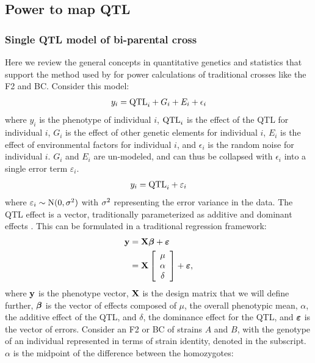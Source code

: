 \subsection{Power to map QTL}

\subsubsection{Single QTL model of bi-parental cross} 

Here we review the general concepts in quantitative genetics and statistics that support the method used by \cite{Sen2005} for power calculations of traditional crosses like the F2 and BC. Consider this model:
\begin{equation}
	y_{i} = \text{QTL}_{i} + G_{i} + E_{i} + \epsilon_{i}
    \label{eq:general_model}
\end{equation}
where $y_{i}$ is the phenotype of individual $i$, $\text{QTL}_{i}$ is the effect of the QTL for individual $i$, $G_{i}$ is the effect of other genetic elements for individual $i$, $E_{i}$ is the effect of environmental factors for individual $i$, and $\epsilon_{i}$ is the random noise for individual $i$. $G_{i}$ and $E_{i}$ are un-modeled, and can thus be collapsed with $\epsilon_{i}$ into a single error term $\varepsilon_{i}$.
\begin{equation}
	y_{i} = \text{QTL}_{i} + \varepsilon_{i}
    \label{eq:reduced_model}
\end{equation}
where $\varepsilon_{i} \sim \text{N}(0, \sigma^{2})$ with $\sigma^{2}$ representing the error variance in the data. The QTL effect is a vector, traditionally parameterized as additive and dominant effects \citep{Lynch1998}. This can be formulated in a traditional regression framework:
\begin{align}
	\mathbf{y} &= \mathbf{X}\boldsymbol{\beta} + \boldsymbol{\varepsilon} \label{eq:linear_model} \\ 
	&= \mathbf{X} \left[\begin{array}{c}\mu \\ \alpha \\ \delta \\ \end{array}\right] + \boldsymbol{\varepsilon} \nonumber,
\end{align}
where $\mathbf{y}$ is the phenotype vector, $\mathbf{X}$ is the design matrix that we will define further, $\boldsymbol{\beta}$ is the vector of effects composed of $\mu$, the overall phenotypic mean, $\alpha$, the additive effect of the QTL, and $\delta$, the dominance effect for the QTL, and $\boldsymbol{\varepsilon}$ is the vector of errors. Consider an F2 or BC of strains $A$ and $B$, with the genotype of an individual represented in terms of strain identity, denoted in the subscript. $\alpha$ is the midpoint of the difference between the homozygotes:
